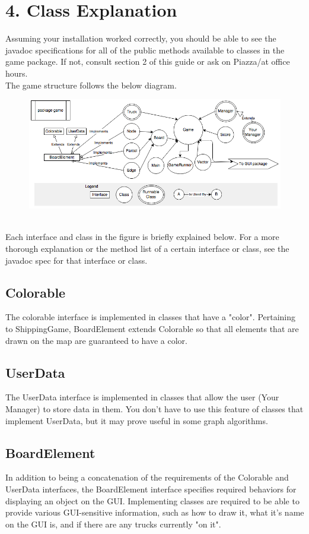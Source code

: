 \documentclass[11pt]{article}
\begin{document}
\section{4. Class Explanation}
Assuming your installation worked correctly, you should be able to see the javadoc specifications for all of the public methods available to classes in the game package. If not, consult section 2 of this guide or ask on Piazza/at office hours.\\
The game structure follows the below diagram.
\begin{figure}[h]
\centerline{\includegraphics[scale=0.7]{hirearchy.png}} 
\end{figure}
\\Each interface and class in the figure is briefly explained below. For a more thorough  explanation or the method list of a certain interface or class, see the javadoc spec for that interface or class.
\subsection{Colorable}
The colorable interface is implemented in classes that have a "color". Pertaining to ShippingGame, BoardElement extends Colorable so that all elements that are drawn on the map are guaranteed to have a color.
\subsection{UserData}
The UserData interface is implemented in classes that allow the user (Your Manager) to store data in them. You don't have to use this feature of classes that implement UserData, but it may prove useful in some graph algorithms.
\subsection{BoardElement}
In addition to being a concatenation of the requirements of the Colorable and UserData interfaces, the BoardElement interface specifies required behaviors for displaying an object on the GUI. Implementing classes are required to be able to provide various GUI-sensitive information, such as how to draw it, what it's name on the GUI is, and if there are any trucks currently "on it".
\end{document}
